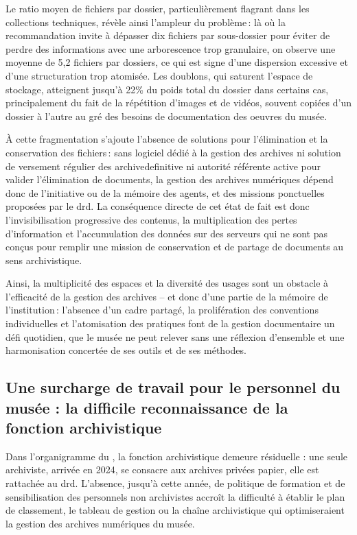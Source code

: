 Le ratio moyen de fichiers par dossier, particulièrement flagrant dans les collections techniques, révèle ainsi l’ampleur du problème : là où la recommandation invite à dépasser dix fichiers par sous-dossier pour éviter de perdre des informations avec une arborescence trop granulaire, on observe une moyenne de 5,2 fichiers par dossiers, ce qui est signe d’une dispersion excessive et d’une structuration trop atomisée. Les doublons, qui saturent l’espace de stockage, atteignent jusqu’à 22\% du poids total du dossier dans certains cas, principalement du fait de la répétition d'images et de vidéos, souvent copiées d'un dossier à l'autre au gré des besoins de documentation des oeuvres du musée.


À cette fragmentation s’ajoute l’absence de solutions pour l’élimination et la conservation des fichiers : sans logiciel dédié à la gestion des archives ni solution de versement régulier des \gls{archivedefinitive} ni autorité référente active pour valider l'élimination de documents, la gestion des archives numériques dépend donc de l’initiative ou de la mémoire des agents, et des missions ponctuelles proposées par le \ac{drd}. La conséquence directe de cet état de fait est donc l’invisibilisation progressive des contenus, la multiplication des pertes d’information et l'accumulation des données sur des serveurs qui ne sont pas conçus pour remplir une mission de conservation et de partage de documents au sens archivistique. 



Ainsi, la multiplicité des espaces et la diversité des usages sont un obstacle à l'efficacité de la gestion des archives -- et donc d'une partie de la mémoire de l'institution : l’absence d’un cadre partagé, la prolifération des conventions individuelles et l’atomisation des pratiques font de la gestion documentaire un défi quotidien, que le musée ne peut relever sans une réflexion d’ensemble et une harmonisation concertée de ses outils et de ses méthodes.


\subsection{Une surcharge de travail pour le personnel du musée : la difficile reconnaissance de la fonction archivistique}


Dans l’organigramme du \mae, la fonction archivistique demeure résiduelle : une seule archiviste, arrivée en 2024, se consacre aux archives privées papier, elle est rattachée au \ac{drd}. L’absence, jusqu'à cette année, de politique de formation et de sensibilisation des personnels non archivistes accroît la difficulté à établir le plan de classement, le tableau de gestion ou la chaîne archivistique qui optimiseraient la gestion des archives numériques du musée.

